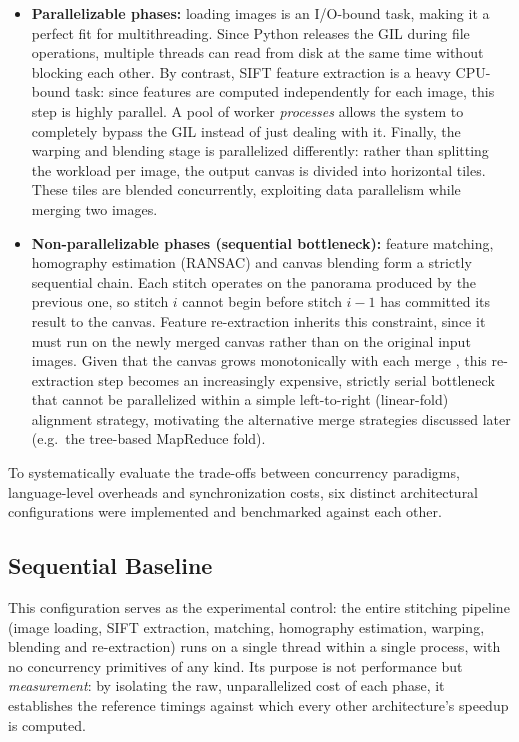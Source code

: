 \documentclass[10pt,twocolumn,letterpaper]{article}
\begin{document}
\begin{itemize}
   \item \textbf{Parallelizable phases:} loading images is an I/O-bound task,
    making it a perfect fit for multithreading. Since Python releases the GIL
    during file operations, multiple threads can read from disk at the same
    time without blocking each other. By contrast, SIFT feature extraction is
    a heavy CPU-bound task: since features are computed independently
    for each image, this step is highly parallel. A pool of worker \emph{processes} allows the system to completely bypass
    the GIL instead of just dealing with it. Finally, the warping and
    blending stage is parallelized differently: rather than splitting the
    workload per image, the output canvas is divided into horizontal tiles.
    These tiles are blended concurrently, exploiting data parallelism while
    merging two images.

    \item \textbf{Non-parallelizable phases (sequential bottleneck):} feature
    matching, homography estimation (RANSAC) and canvas blending form a
    strictly sequential chain. Each stitch operates on the panorama produced by
    the previous one, so stitch $i$ cannot begin before stitch $i-1$ has
    committed its result to the canvas. Feature re-extraction inherits this
    constraint, since it must run on the newly merged canvas rather than on the
    original input images. Given that the canvas grows monotonically with each merge
    , this re-extraction step becomes an
    increasingly expensive, strictly serial bottleneck that cannot be
    parallelized within a simple left-to-right (linear-fold) alignment
    strategy, motivating the alternative merge strategies discussed later
    (e.g.\ the tree-based MapReduce fold).
\end{itemize}

To systematically evaluate the trade-offs between concurrency paradigms,
language-level overheads and synchronization costs, six distinct architectural
configurations were implemented and benchmarked against each other.

\subsection{Sequential Baseline}
This configuration serves as the experimental control: the entire stitching
pipeline (image loading, SIFT extraction, matching, homography estimation,
warping, blending and re-extraction) runs on a single thread within a single
process, with no concurrency primitives of any kind. Its purpose is not
performance but \emph{measurement}: by isolating the raw, unparallelized cost of
each phase, it establishes the reference timings against which every other
architecture's speedup is computed.
\end{document}
